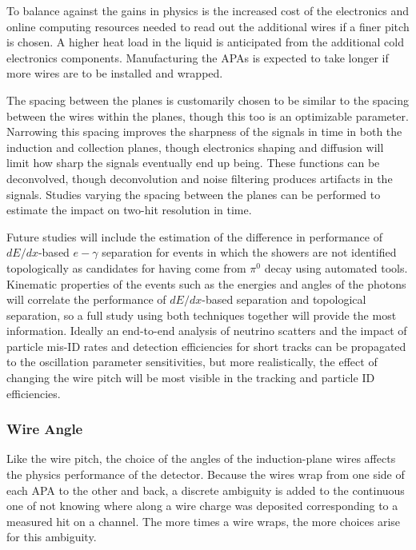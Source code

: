 To balance against the gains in physics is the increased cost of the
electronics and online computing resources needed to read out the
additional wires if a finer pitch is chosen.  A higher heat load in
the liquid is anticipated from the additional cold electronics
components.  Manufacturing the APAs is expected to take longer if
more wires are to be installed and wrapped.

The spacing between the planes is customarily chosen to be similar to
the spacing between the wires within the planes, though this too is an
optimizable parameter.  Narrowing this spacing improves the sharpness
of the signals in time in both the induction and collection planes,
though electronics shaping and diffusion will limit how sharp the
signals eventually end up being.  These functions can be deconvolved,
though deconvolution and noise filtering produces artifacts in the
signals.  Studies varying the spacing between the planes can be
performed to estimate the impact on two-hit resolution in time.

Future studies will include the estimation of the difference in
performance of $dE/dx$-based $e-\gamma$ separation for events in which
the showers are not identified topologically as candidates for having
come from $\pi^0$ decay using automated tools.  Kinematic properties
of the events such as the energies and angles of the photons will
correlate the performance of $dE/dx$-based separation and topological
separation, so a full study using both techniques together will
provide the most information.  Ideally an end-to-end analysis of
neutrino scatters and the impact of particle mis-ID rates and
detection efficiencies for short tracks can be propagated to the
oscillation parameter sensitivities, but more realistically, the
effect of changing the wire pitch will be most visible in the tracking
and particle ID efficiencies.

\subsubsection{Wire Angle}

Like the wire pitch, the choice of the angles of the induction-plane
wires affects the physics performance of the detector.  Because the
wires wrap from one side of each APA to the other and back, a discrete
ambiguity is added to the continuous one of not knowing where along a
wire charge was deposited corresponding to a measured hit on a
channel.  The more times a wire wraps, the more choices arise for this
ambiguity.

